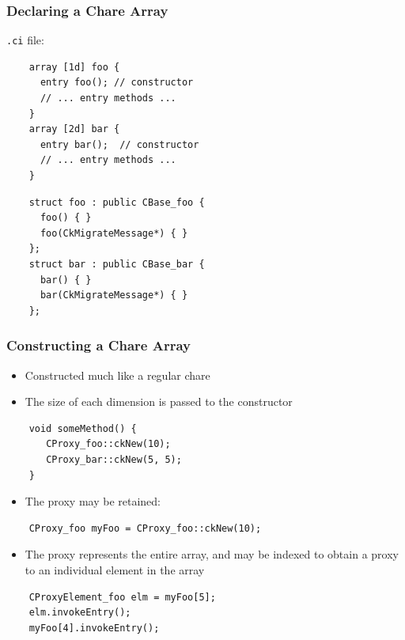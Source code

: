 
\begin{frame}[fragile]
  \frametitle{Declaring a Chare Array}
  \texttt{.ci} file:
  \begin{lstlisting}
    array [1d] foo {
      entry foo(); // constructor
      // ... entry methods ...
    }
    array [2d] bar {
      entry bar();  // constructor
      // ... entry methods ...
    }
  \end{lstlisting}

  \begin{lstlisting}
    struct foo : public CBase_foo {
      foo() { }
      foo(CkMigrateMessage*) { }
    };
    struct bar : public CBase_bar {
      bar() { }
      bar(CkMigrateMessage*) { }
    };
  \end{lstlisting}
\end{frame}

\begin{frame}[fragile]
  \frametitle{Constructing a Chare Array}
  \begin{itemize}
    \item Constructed much like a regular chare
    \item The size of each dimension is passed to the constructor
  \end{itemize}
  \begin{lstlisting}
    void someMethod() {
       CProxy_foo::ckNew(10);
       CProxy_bar::ckNew(5, 5);
    }
  \end{lstlisting}
  \begin{itemize}
  \item The proxy may be retained:
  \end{itemize}
  \begin{lstlisting}
    CProxy_foo myFoo = CProxy_foo::ckNew(10);
  \end{lstlisting}
  \begin{itemize}
  \item The proxy represents the entire array, and may be indexed to obtain a
    proxy to an individual element in the array
  \end{itemize}
  \begin{lstlisting}
    CProxyElement_foo elm = myFoo[5];
    elm.invokeEntry();
    myFoo[4].invokeEntry();
  \end{lstlisting}
\end{frame}

